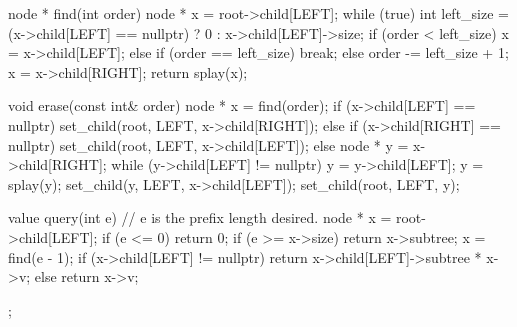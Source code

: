 \begin{lstlising}
{	node * find(int order) {
		node * x = root->child[LEFT];
		while (true) {
			int left_size = (x->child[LEFT] == nullptr) ? 0 : x->child[LEFT]->size;
			if (order < left_size) x = x->child[LEFT];
			else if (order == left_size) break;
			else {
				order -= left_size + 1;
				x = x->child[RIGHT];
			}
		}
		return splay(x);
	}
	
	void erase(const int& order) {
		node * x = find(order);
		if (x->child[LEFT] == nullptr) set_child(root, LEFT, x->child[RIGHT]);
		else if (x->child[RIGHT] == nullptr) set_child(root, LEFT, x->child[LEFT]);
		else {
			node * y = x->child[RIGHT];
			while (y->child[LEFT] != nullptr) y = y->child[LEFT];
			y = splay(y);
			set_child(y, LEFT, x->child[LEFT]);
			set_child(root, LEFT, y);
		}
	}
	
	value query(int e) { // e is the prefix length desired.
		node * x = root->child[LEFT];
		if (e <= 0) return 0;
		if (e >= x->size) return x->subtree;
		x = find(e - 1);
		if (x->child[LEFT] != nullptr) return x->child[LEFT]->subtree * x->v;
		else return x->v;
	}
};
\end{lstlising}